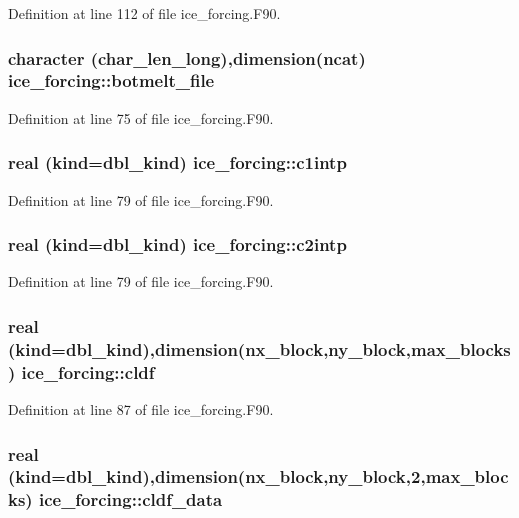 Definition at line 112 of file ice\_\-forcing.F90.\hypertarget{namespaceice__forcing_a0278acba1215b398580f3e503a8baf11}{
\subsubsection[{botmelt\_\-file}]{\setlength{\rightskip}{0pt plus 5cm}character (char\_\-len\_\-long),dimension(ncat) {\bf ice\_\-forcing::botmelt\_\-file}}}
\label{namespaceice__forcing_a0278acba1215b398580f3e503a8baf11}


Definition at line 75 of file ice\_\-forcing.F90.\hypertarget{namespaceice__forcing_a56dcb1f5a344ec3a10ce9138f9418e51}{
\subsubsection[{c1intp}]{\setlength{\rightskip}{0pt plus 5cm}real (kind=dbl\_\-kind) {\bf ice\_\-forcing::c1intp}}}
\label{namespaceice__forcing_a56dcb1f5a344ec3a10ce9138f9418e51}


Definition at line 79 of file ice\_\-forcing.F90.\hypertarget{namespaceice__forcing_ad041327090c6188e198972d2e2162197}{
\subsubsection[{c2intp}]{\setlength{\rightskip}{0pt plus 5cm}real (kind=dbl\_\-kind) {\bf ice\_\-forcing::c2intp}}}
\label{namespaceice__forcing_ad041327090c6188e198972d2e2162197}


Definition at line 79 of file ice\_\-forcing.F90.\hypertarget{namespaceice__forcing_a251b0646126ab48de9758116bec0c414}{
\subsubsection[{cldf}]{\setlength{\rightskip}{0pt plus 5cm}real (kind=dbl\_\-kind),dimension(nx\_\-block,ny\_\-block,max\_\-blocks) {\bf ice\_\-forcing::cldf}}}
\label{namespaceice__forcing_a251b0646126ab48de9758116bec0c414}


Definition at line 87 of file ice\_\-forcing.F90.\hypertarget{namespaceice__forcing_aa497c4b2e2bdd7e83e0b08b306c364c8}{
\subsubsection[{cldf\_\-data}]{\setlength{\rightskip}{0pt plus 5cm}real (kind=dbl\_\-kind),dimension(nx\_\-block,ny\_\-block,2,max\_\-blocks) {\bf ice\_\-forcing::cldf\_\-data}}}
\label{namespaceice__forcing_aa497c4b2e2bdd7e83e0b08b306c364c8}


